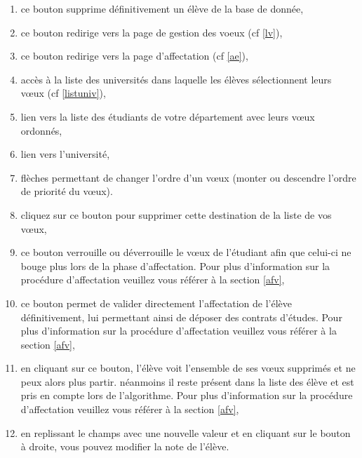                       \begin{enumerate}
                      	\item \att ce bouton supprime définitivement un élève de la base de donnée,
                      	\item ce bouton redirige vers la page de gestion des voeux (cf \ref{lv}),
                      	\item ce bouton redirige vers la page d'affectation (cf \ref{ae}),
                      	\item accès à la liste des universités dans laquelle les élèves sélectionnent leurs vœux (cf \ref{listuniv}),
                     	\item lien vers la liste des étudiants de votre département avec leurs vœux ordonnés,
                      	\item lien vers l'université,
                      	\item flèches permettant de changer l'ordre d'un vœux (monter ou descendre l'ordre de priorité du vœux).
                      	\item cliquez sur ce bouton pour supprimer cette destination de la liste de vos vœux, 
                      	\item ce bouton verrouille ou déverrouille le vœux de l'étudiant afin que celui-ci ne bouge plus lors de la phase d'affectation. Pour plus d'information sur la procédure d'affectation veuillez vous référer à la section \ref{afv},
                      	\item ce bouton permet de valider directement l'affectation de l'élève définitivement, lui permettant ainsi de déposer des contrats d'études. Pour plus d'information sur la procédure d'affectation veuillez vous référer à la section \ref{afv},
                      	\item en cliquant sur ce bouton, l'élève voit l'ensemble de ses vœux supprimés et ne peux alors plus partir. néanmoins il reste présent dans la liste des élève et est pris en compte lors de l'algorithme. Pour plus d'information sur la procédure d'affectation veuillez vous référer à la section \ref{afv},
                      	\item en replissant le champs avec une nouvelle valeur et en cliquant sur le bouton à droite, vous pouvez modifier la note de l'élève.
                      \end{enumerate}

         
    
